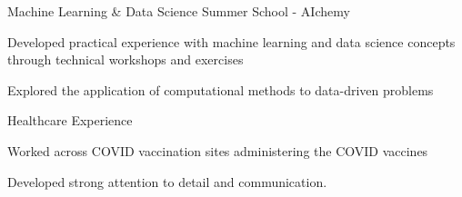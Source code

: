 \vspace{5mm}
\begin{cventries}

\cventry
    {Machine Learning \& Data Science Summer School - AIchemy}
    {}
    {}
    {}
    {
      \begin{cvitems}
      \item {Developed practical experience with machine learning and data science concepts through technical workshops and exercises}
        \item {Explored the application of computational methods to data-driven problems}
      \end{cvitems}
    }
    
  \cventry
    {Healthcare Experience}
    {}
    {}
    {}
    {
      \begin{cvitems}
      \item{Worked across COVID vaccination sites administering the COVID vaccines}
      \item{Developed strong attention to detail and communication.}
      \end{cvitems}
    }
\end{cventries}

